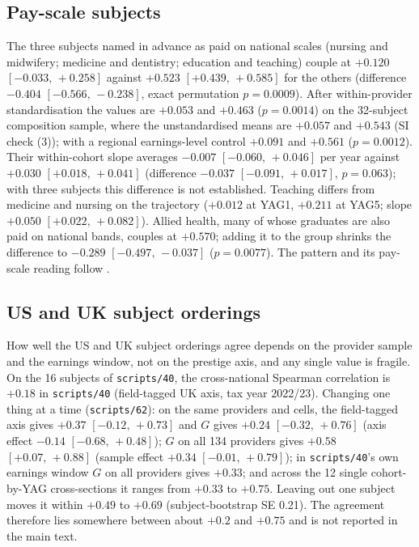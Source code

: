 \documentclass[11pt]{article}
\newcommand{\ci}[2]{$[#1,\allowbreak\,#2]$}
\newcommand{\scr}[1]{\texttt{scripts/#1}}
\begin{document}
\subsection{Pay-scale subjects}\label{sec:ukpayscale}

The three subjects named in advance as paid on national scales (nursing and midwifery; medicine and dentistry;
education and teaching) couple at $+0.120$ \ci{-0.033}{+0.258} against $+0.523$ \ci{+0.439}{+0.585} for the others
(difference $-0.404$ \ci{-0.566}{-0.238}, exact permutation $p=0.0009$). After within-provider standardisation the
values are $+0.053$ and $+0.463$ ($p=0.0014$) on the 32-subject composition sample, where the unstandardised means
are $+0.057$ and $+0.543$ (SI check (3)); with a regional earnings-level control $+0.091$ and $+0.561$
($p=0.0012$). Their within-cohort slope averages $-0.007$ \ci{-0.060}{+0.046} per year against $+0.030$ \ci{+0.018}{+0.041}
(difference $-0.037$ \ci{-0.091}{+0.017}, $p=0.063$); with three subjects this difference is not established.
Teaching differs from medicine and nursing on the trajectory ($+0.012$ at YAG1, $+0.211$ at YAG5; slope $+0.050$
\ci{+0.022}{+0.082}). Allied health, many of whose graduates are also paid on national bands, couples at $+0.570$;
adding it to the group shrinks the difference to $-0.289$ \ci{-0.497}{-0.037} ($p=0.0077$). The pattern and its
pay-scale reading follow \citet{britton2022how}.

\subsection{US and UK subject orderings}\label{sec:xnat}

How well the US and UK subject orderings agree depends on the provider sample and the earnings window, not on
the prestige axis, and any single value is fragile. On the 16 subjects of \scr{40}, the cross-national Spearman
correlation is $+0.18$ in \scr{40} (field-tagged UK axis, tax year 2022/23). Changing one thing at a time
(\scr{62}): on the same providers and cells, the field-tagged axis gives $+0.37$ \ci{-0.12}{+0.73} and $G$ gives $+0.24$
\ci{-0.32}{+0.76} (axis effect $-0.14$ \ci{-0.68}{+0.48}); $G$ on all 134 providers gives $+0.58$ \ci{+0.07}{+0.88} (sample
effect $+0.34$ \ci{-0.01}{+0.79}); in \scr{40}'s own earnings window $G$ on all providers gives $+0.33$; and across the 12
single cohort-by-YAG cross-sections it ranges from $+0.33$ to $+0.75$. Leaving out one subject moves it within
$+0.49$ to $+0.69$ (subject-bootstrap SE 0.21). The agreement therefore lies somewhere between about $+0.2$ and
$+0.75$ and is not reported in the main text.
\end{document}
